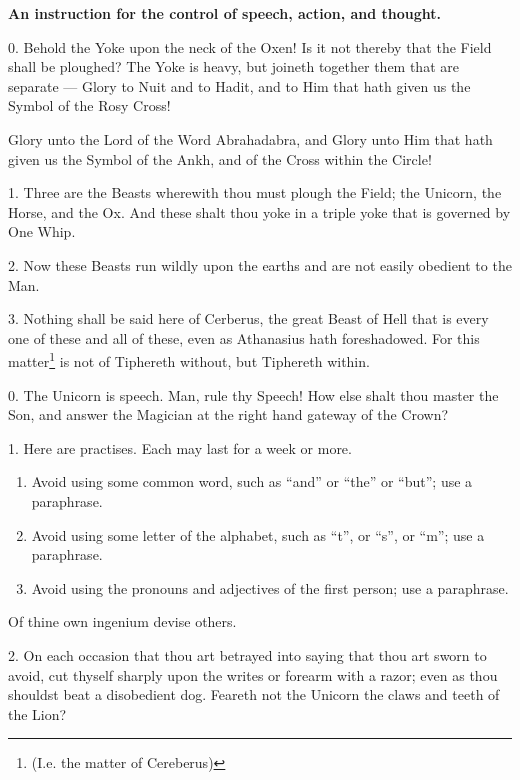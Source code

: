 
\textbf{An instruction for the control of speech, action, and thought.}


0. Behold the Yoke upon the neck of the Oxen! Is it not thereby that the Field shall be ploughed? The Yoke is heavy, but joineth together them that are separate --- Glory to Nuit and to Hadit, and to Him that hath given us the Symbol of the Rosy Cross!

Glory unto the Lord of the Word Abrahadabra, and Glory unto Him that hath given us the Symbol of the Ankh, and of the Cross within the Circle!

1. Three are the Beasts wherewith thou must plough the Field; the Unicorn, the Horse, and the Ox. And these shalt thou yoke in a triple yoke that is governed by One Whip.

2. Now these Beasts run wildly upon the earths and are not easily obedient to the Man.

3. Nothing shall be said here of Cerberus, the great Beast of Hell that is every one of these and all of these, even as Athanasius hath foreshadowed. For this matter\footnote{(I.e. the matter of Cereberus)} is not of Tiphereth without, but Tiphereth within.

0. The Unicorn is speech. Man, rule thy Speech! How else shalt thou master the Son, and answer the Magician at the right hand gateway of the Crown?

1. Here are practises. Each may last for a week or more.
\begin{enumerate}[label=\greek*.]
\item Avoid using some common word, such as \enquote{and} or \enquote{the} or \enquote{but}; use a paraphrase.

\item Avoid using some letter of the alphabet, such as \enquote{t}, or \enquote{s}, or \enquote{m}; use a paraphrase.

\item Avoid using the pronouns and adjectives of the first person; use a paraphrase.
\end{enumerate}
Of thine own ingenium devise others.

2. On each occasion that thou art betrayed into saying that thou art sworn to avoid, cut thyself sharply upon the writes or forearm with a razor; even as thou shouldst beat a disobedient dog. Feareth not the Unicorn the claws and teeth of the Lion?

